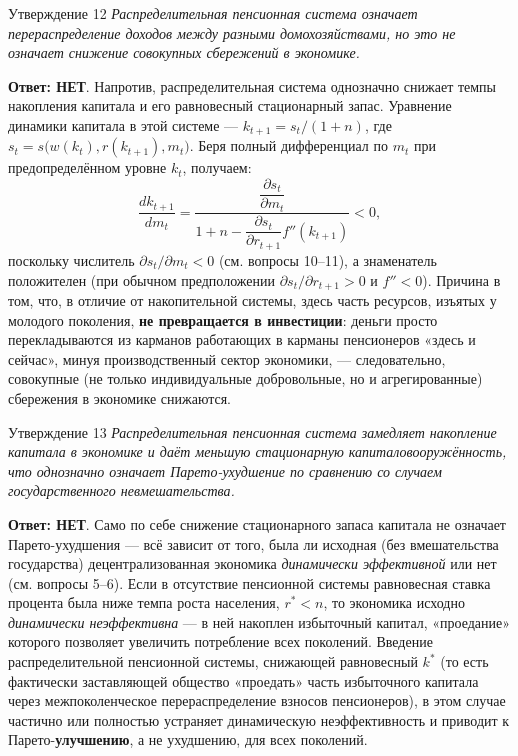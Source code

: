 \documentclass[10pt,a4paper]{article}
\newcommand{\qnet}{\textbf{\color{nored}Ответ: НЕТ}}
\newenvironment{answer}[2]{%
  \begin{qbox}{Утверждение #1}
  \textit{#2}\par\smallskip
}{%
  \end{qbox}\vspace{2pt}
}
\begin{document}
\begin{answer}{12}{Распределительная пенсионная система означает перераспределение доходов между разными домохозяйствами, но это не означает снижение совокупных сбережений в экономике.}
\qnet. Напротив, распределительная система однозначно снижает темпы накопления капитала и его равновесный стационарный запас. Уравнение динамики капитала в этой системе — $k_{t+1}=s_t/(1+n)$, где $s_t=s\bigl(w(k_t),r(k_{t+1}),m_t\bigr)$. Беря полный дифференциал по $m_t$ при предопределённом уровне $k_t$, получаем:
\[
\frac{dk_{t+1}}{dm_t} = \dfrac{\dfrac{\partial s_t}{\partial m_t}}{1+n-\dfrac{\partial s_t}{\partial r_{t+1}}f''(k_{t+1})} < 0,
\]
поскольку числитель $\partial s_t/\partial m_t<0$ (см. вопросы 10--11), а знаменатель положителен (при обычном предположении $\partial s_t/\partial r_{t+1}>0$ и $f''<0$). Причина в том, что, в отличие от накопительной системы, здесь часть ресурсов, изъятых у молодого поколения, \textbf{не превращается в инвестиции}: деньги просто перекладываются из карманов работающих в карманы пенсионеров «здесь и сейчас», минуя производственный сектор экономики, — следовательно, совокупные (не только индивидуальные добровольные, но и агрегированные) сбережения в экономике снижаются.
\end{answer}
 
\begin{answer}{13}{Распределительная пенсионная система замедляет накопление капитала в экономике и даёт меньшую стационарную капиталовооружённость, что однозначно означает Парето-ухудшение по сравнению со случаем государственного невмешательства.}
\qnet. Само по себе снижение стационарного запаса капитала не означает Парето-ухудшения — всё зависит от того, была ли исходная (без вмешательства государства) децентрализованная экономика \emph{динамически эффективной} или нет (см. вопросы 5--6). Если в отсутствие пенсионной системы равновесная ставка процента была ниже темпа роста населения, $r^{*}<n$, то экономика исходно \emph{динамически неэффективна} — в ней накоплен избыточный капитал, «проедание» которого позволяет увеличить потребление всех поколений. Введение распределительной пенсионной системы, снижающей равновесный $k^{*}$ (то есть фактически заставляющей общество «проедать» часть избыточного капитала через межпоколенческое перераспределение взносов пенсионеров), в этом случае частично или полностью устраняет динамическую неэффективность и приводит к Парето-\textbf{улучшению}, а не ухудшению, для всех поколений.
\end{answer}
 
\end{document}
